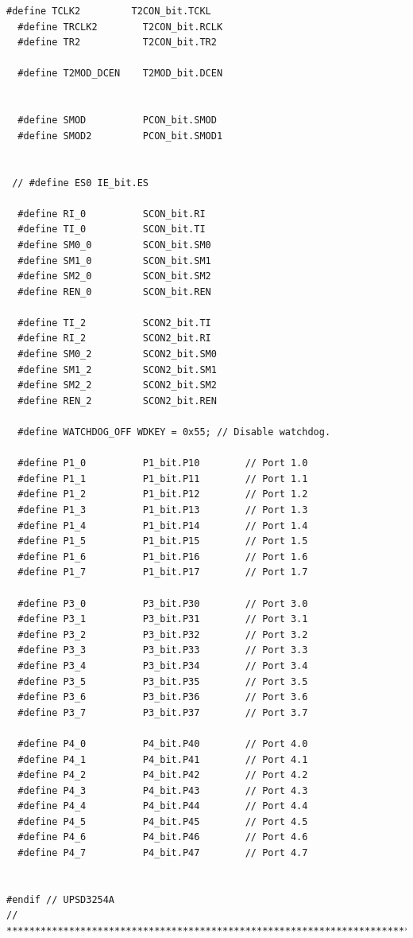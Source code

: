 \documentclass[10pt,a4paper,final]{article}
\begin{document}
\begin{lstlisting}[label={list:first},caption=Code source]
  #define TCLK2         T2CON_bit.TCKL
  #define TRCLK2        T2CON_bit.RCLK
  #define TR2           T2CON_bit.TR2

  #define T2MOD_DCEN    T2MOD_bit.DCEN


  #define SMOD          PCON_bit.SMOD
  #define SMOD2         PCON_bit.SMOD1


 // #define ES0 IE_bit.ES

  #define RI_0          SCON_bit.RI
  #define TI_0          SCON_bit.TI
  #define SM0_0         SCON_bit.SM0
  #define SM1_0         SCON_bit.SM1
  #define SM2_0         SCON_bit.SM2
  #define REN_0         SCON_bit.REN

  #define TI_2          SCON2_bit.TI
  #define RI_2          SCON2_bit.RI
  #define SM0_2         SCON2_bit.SM0
  #define SM1_2         SCON2_bit.SM1
  #define SM2_2         SCON2_bit.SM2
  #define REN_2         SCON2_bit.REN

  #define WATCHDOG_OFF WDKEY = 0x55; // Disable watchdog.

  #define P1_0          P1_bit.P10        // Port 1.0
  #define P1_1          P1_bit.P11        // Port 1.1
  #define P1_2          P1_bit.P12        // Port 1.2
  #define P1_3          P1_bit.P13        // Port 1.3
  #define P1_4          P1_bit.P14        // Port 1.4
  #define P1_5          P1_bit.P15        // Port 1.5
  #define P1_6          P1_bit.P16        // Port 1.6
  #define P1_7          P1_bit.P17        // Port 1.7

  #define P3_0          P3_bit.P30        // Port 3.0
  #define P3_1          P3_bit.P31        // Port 3.1
  #define P3_2          P3_bit.P32        // Port 3.2
  #define P3_3          P3_bit.P33        // Port 3.3
  #define P3_4          P3_bit.P34        // Port 3.4
  #define P3_5          P3_bit.P35        // Port 3.5
  #define P3_6          P3_bit.P36        // Port 3.6
  #define P3_7          P3_bit.P37        // Port 3.7

  #define P4_0          P4_bit.P40        // Port 4.0
  #define P4_1          P4_bit.P41        // Port 4.1
  #define P4_2          P4_bit.P42        // Port 4.2
  #define P4_3          P4_bit.P43        // Port 4.3
  #define P4_4          P4_bit.P44        // Port 4.4
  #define P4_5          P4_bit.P45        // Port 4.5
  #define P4_6          P4_bit.P46        // Port 4.6
  #define P4_7          P4_bit.P47        // Port 4.7


#endif // UPSD3254A
// *****************************************************************************


\end{lstlisting}
\end{document}
